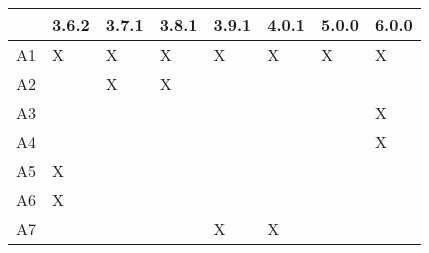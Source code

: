\begin{tabular}{llllllll}
\toprule
{} & 3.6.2 & 3.7.1 & 3.8.1 & 3.9.1 & 4.0.1 & 5.0.0 & 6.0.0 \\
\midrule
A1 &     X &     X &     X &     X &     X &     X &     X \\
A2 &       &     X &     X &       &       &       &       \\
A3 &       &       &       &       &       &       &     X \\
A4 &       &       &       &       &       &       &     X \\
A5 &     X &       &       &       &       &       &       \\
A6 &     X &       &       &       &       &       &       \\
A7 &       &       &       &     X &     X &       &       \\
\bottomrule
\end{tabular}
